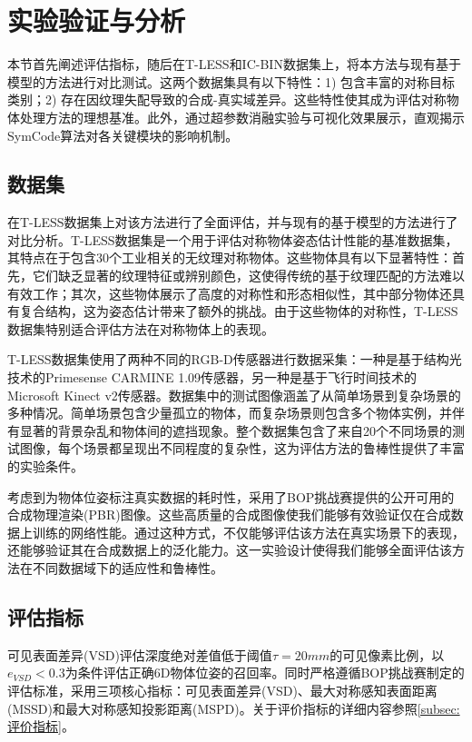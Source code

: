 \section{实验验证与分析}

本节首先阐述评估指标，随后在T-LESS\cite{tless}和IC-BIN\cite{icbin}数据集上，将本方法与现有基于模型的方法进行对比测试。这两个数据集具有以下特性：1) 包含丰富的对称目标类别；2) 存在因纹理失配导致的合成-真实域差异。这些特性使其成为评估对称物体处理方法的理想基准。此外，通过超参数消融实验与可视化效果展示，直观揭示SymCode算法对各关键模块的影响机制。

\subsection{数据集}

\par 在T-LESS数据集\cite{tless}上对该方法进行了全面评估，并与现有的基于模型的方法进行了对比分析。T-LESS数据集是一个用于评估对称物体姿态估计性能的基准数据集，其特点在于包含30个工业相关的无纹理对称物体。这些物体具有以下显著特性：首先，它们缺乏显著的纹理特征或辨别颜色，这使得传统的基于纹理匹配的方法难以有效工作；其次，这些物体展示了高度的对称性和形态相似性，其中部分物体还具有复合结构，这为姿态估计带来了额外的挑战。由于这些物体的对称性，T-LESS数据集特别适合评估方法在对称物体上的表现。
\par T-LESS数据集使用了两种不同的RGB-D传感器进行数据采集：一种是基于结构光技术的Primesense CARMINE 1.09传感器，另一种是基于飞行时间技术的Microsoft Kinect v2传感器。数据集中的测试图像涵盖了从简单场景到复杂场景的多种情况。简单场景包含少量孤立的物体，而复杂场景则包含多个物体实例，并伴有显著的背景杂乱和物体间的遮挡现象。整个数据集包含了来自20个不同场景的测试图像，每个场景都呈现出不同程度的复杂性，这为评估方法的鲁棒性提供了丰富的实验条件。
\par 考虑到为物体位姿标注真实数据的耗时性，采用了BOP挑战赛\cite{hodan2018bop}提供的公开可用的合成物理渲染(PBR)图像。这些高质量的合成图像使我们能够有效验证仅在合成数据上训练的网络性能。通过这种方式，不仅能够评估该方法在真实场景下的表现，还能够验证其在合成数据上的泛化能力。这一实验设计使得我们能够全面评估该方法在不同数据域下的适应性和鲁棒性。

\subsection{评估指标}

可见表面差异(VSD)评估深度绝对差值低于阈值$\tau=20mm$的可见像素比例，以 $e_{VSD}<0.3$\cite{pitteri2019object}为条件评估正确6D物体位姿的召回率。同时严格遵循BOP挑战赛\cite{hodan2024bop}制定的评估标准，采用三项核心指标：可见表面差异(VSD)、最大对称感知表面距离(MSSD)和最大对称感知投影距离(MSPD)。关于评价指标的详细内容参照\autoref{subsec:评价指标}。

